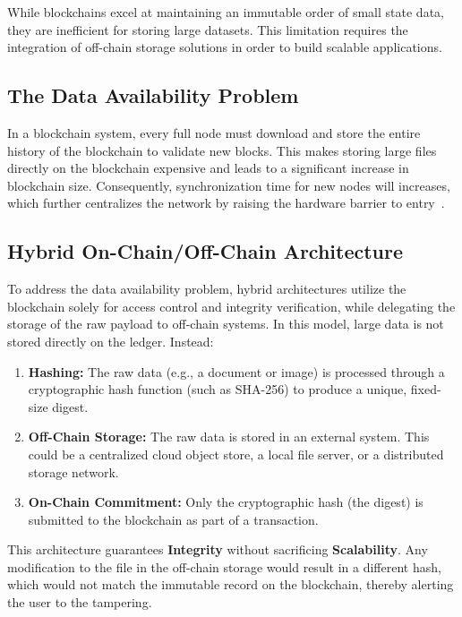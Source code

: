 While blockchains excel at maintaining an immutable order of small state data, they are inefficient for storing large datasets. This limitation requires the integration of off-chain storage solutions in order to build scalable applications.

\subsection{The Data Availability Problem} \label{ch2_data_availability}
In a blockchain system, every full node must download and store the entire history of the blockchain to validate new blocks. This makes storing large files directly on the blockchain expensive and leads to a significant increase in blockchain size. Consequently, synchronization time for new nodes will increases, which further centralizes the network by raising the hardware barrier to entry~\cite{ipfsEvaluation}.

\subsection{Hybrid On-Chain/Off-Chain Architecture}
To address the data availability problem, hybrid architectures utilize the blockchain solely for access control and integrity verification, while delegating the storage of the raw payload to off-chain systems. In this model, large data is not stored directly on the ledger. Instead:

\begin{enumerate}
    \item \textbf{Hashing:} The raw data (e.g., a document or image) is processed through a cryptographic hash function (such as SHA-256) to produce a unique, fixed-size digest.
    \item \textbf{Off-Chain Storage:} The raw data is stored in an external system. This could be a centralized cloud object store, a local file server, or a distributed storage network.
    \item \textbf{On-Chain Commitment:} Only the cryptographic hash (the digest) is submitted to the blockchain as part of a transaction.
\end{enumerate}

This architecture guarantees \textbf{Integrity} without sacrificing \textbf{Scalability}. Any modification to the file in the off-chain storage would result in a different hash, which would not match the immutable record on the blockchain, thereby alerting the user to the tampering.


